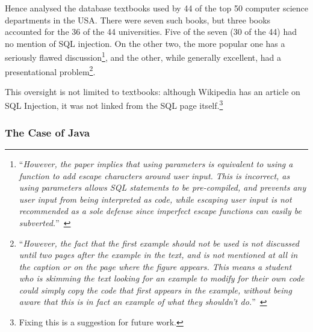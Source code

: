 \documentclass[conference]{IEEEtran}
\begin{document}
Hence \cite{Drop2019} analysed the database textbooks used by  44 of the top 50 computer science
departments in the USA. %
There were seven such books, but three books accounted for the 36 of the 44 universities. Five of the seven (30 of the 44) had no mention of SQL injection. On the other two, the more popular one has a seriously flawed discussion\footnote{``{\emph{However, the paper implies that using parameters is equivalent to using a function to add escape characters
around user input. This is incorrect, as using parameters allows
SQL statements to be pre-compiled, and prevents any user input
from being interpreted as code, while escaping user input is not
recommended as a sole defense since imperfect escape functions
can easily be subverted.}}''~\cite{Drop2019}}, and the other, while generally excellent, had a presentational problem\footnote{``{\emph{However, the fact that the first
example should not be used is not discussed until two pages after
the example in the text, and is not mentioned at all in the caption or
on the page where the figure appears. This means a student who is
skimming the text looking for an example to modify for their own
code could simply copy the code that first appears in the example,
without being aware that this is in fact an example of what they
shouldn't do.}}''~\cite{Drop2019}}.
\par
This oversight is not limited to textbooks: although Wikipedia has an article on SQL Injection, it was not linked from the SQL page itself.\footnote{Fixing this is a suggestion for future work.}

\subsubsection{The Case of Java}\label{sec:Java}
\end{document}
